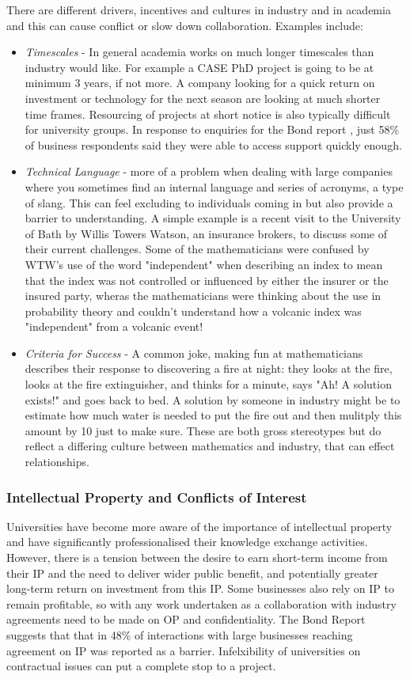 \documentclass[11pt]{article} %
\begin{document}
	There are different drivers, incentives and cultures in industry and in academia and this can cause conflict or slow down collaboration. Examples include: 
	\begin{itemize}
		\item \textit{Timescales} - In general academia works on much longer timescales than industry would like. For example a CASE PhD project is going to be at minimum 3 years, if not more. A company looking for a quick return on investment or technology for the next season are looking at much shorter time frames. Resourcing of projects at short notice is also typically difficult for university groups. In response to enquiries for the Bond report \cite{Bond}, just 58\% of business respondents said they were able to access support quickly enough. 
		\item \textit{Technical Language} -  more of a problem when dealing with large companies where you sometimes find an internal language and series of acronyms, a type of slang. This can feel excluding to individuals coming in but also provide a barrier to understanding. A simple example is a recent visit to the University of Bath by Willis Towers Watson, an insurance brokers, to discuss some of their current challenges. Some of the mathematicians were confused by WTW's use of the word "independent" when describing an index to mean that the index was not controlled or influenced by either the insurer or the insured party, wheras the mathematicians were thinking about the use in probability theory and couldn't understand how a volcanic index was "independent" from a volcanic event!
		\item \textit{Criteria for Success} - A common joke, making fun at mathematicians describes their response to discovering a fire at night: they looks at the fire, looks at the fire extinguisher, and thinks for a minute, says "Ah! A solution exists!" and goes back to bed. A solution by someone in industry might be to estimate how much water is needed to put the fire out and then mulitply this amount by 10 just to make sure. These are both gross stereotypes but do reflect a differing culture between mathematics and industry, that can effect relationships.		
	\end{itemize}

	
	\subsubsection{Intellectual Property and Conflicts of Interest} 
	Universities have  become more aware of the importance of intellectual property and have significantly professionalised their knowledge exchange activities. However, there is a tension between the desire to earn short-term income from their IP and the need to deliver wider public benefit, and potentially greater long-term return on investment from this IP. Some businesses also rely on IP to remain profitable, so with any work undertaken as a collaboration with industry agreements need to be made on OP and confidentiality. The Bond Report \cite{Bond} suggests that that in 48\% of interactions with large businesses reaching agreement on IP was reported as a barrier.   Infelxibility of universities on contractual issues can put a complete stop to a project. 
	
\end{document}
